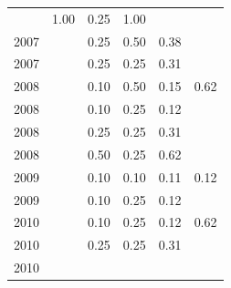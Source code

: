 \begin{table}[H]
\begin{tabular}{| l | c | c | c | c | c |}
          &
          1.00
          &
          0.25
          &
          1.00
          &
          \\
            2007
          &
          
          &
          0.25
          &
          0.50
          &
          0.38
          &
          \\
            2007
          &
          
          &
          0.25
          &
          0.25
          &
          0.31
          &
          \\
\hline
            2008
          &
          
          &
          0.10
          &
          0.50
          &
          0.15
          &
            {\color{blue} 0.62}
          \\
            2008
          &
          
          &
          0.10
          &
          0.25
          &
          0.12
          &
          \\
            2008
          &
          
          &
          0.25
          &
          0.25
          &
          0.31
          &
          \\
            2008
          &
          
          &
          0.50
          &
          0.25
          &
          0.62
          &
          \\
\hline
            2009
          &
          
          &
          0.10
          &
          0.10
          &
          0.11
          &
            {\color{red} 0.12}
          \\
            2009
          &
          
          &
          0.10
          &
          0.25
          &
          0.12
          &
          \\
\hline
            2010
          &
          
          &
          0.10
          &
          0.25
          &
          0.12
          &
            {\color{blue} 0.62}
          \\
            2010
          &
          
          &
          0.25
          &
          0.25
          &
          0.31
          &
          \\
            2010
          &
          

\end{tabular}
\end{table}
